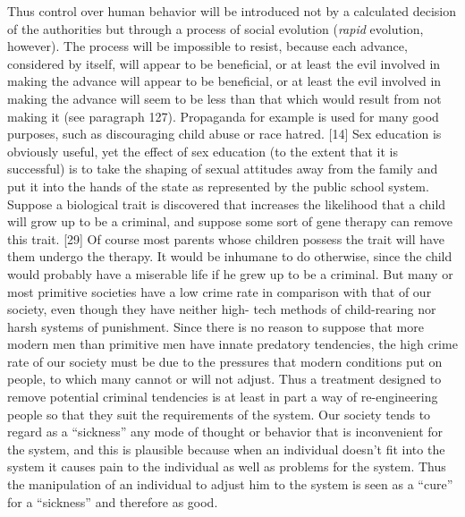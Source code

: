  Thus control over human behavior will be introduced not by a calculated decision of the authorities but through a process of social evolution ({\em rapid} evolution, however). The process will be impossible to resist, because each advance, considered by itself, will appear to be beneficial, or at least the evil involved in making the advance will appear to be beneficial, or at least the evil involved in making the advance will seem to be less than that which would result from not making it (see paragraph 127). Propaganda for example is used for many good purposes, such as discouraging child abuse or race hatred. [14] Sex education is obviously useful, yet the effect of sex education (to the extent that it is successful) is to take the shaping of sexual attitudes away from the family and put it into the hands of the state as represented by the public school system.
 Suppose a biological trait is discovered that increases the likelihood that a child will grow up to be a criminal, and suppose some sort of gene therapy can remove this trait. [29] Of course most parents whose children possess the trait will have them undergo the therapy. It would be inhumane to do otherwise, since the child would probably have a miserable life if he grew up to be a criminal. But many or most primitive societies have a low crime rate in comparison with that of our society, even though they have neither high- tech methods of child-rearing nor harsh systems of punishment. Since there is no reason to suppose that more modern men than primitive men have innate predatory tendencies, the high crime rate of our society must be due to the pressures that modern conditions put on people, to which many cannot or will not adjust. Thus a treatment designed to remove potential criminal tendencies is at least in part a way of re-engineering people so that they suit the requirements of the system.
 Our society tends to regard as a “sickness” any mode of thought or behavior that is inconvenient for the system, and this is plausible because when an individual doesn’t fit into the system it causes pain to the individual as well as problems for the system. Thus the manipulation of an individual to adjust him to the system is seen as a “cure” for a “sickness” and therefore as good.
